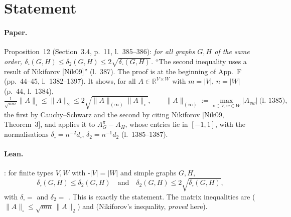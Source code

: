 

\paperversion

\section{Statement}

\paragraph{Paper.} Proposition~12 (Section~3.4, p.~11, l.~385--386): \emph{for all graphs $G,H$ of the same order,
$\delta_\square(G,H)\le\delta_2(G,H)\le2\sqrt{\delta_\square(G,H)}$.} ``The second inequality uses a result of
Nikiforov [Nik09]'' (l.~387). The proof is at the beginning of App.~F (pp.~44--45, l.~1382--1397). It shows, for all
$A\in\mathbb R^{V\times W}$ with $m=|V|$, $n=|W|$ (p.~44, l.~1384),
\[ \tfrac1{\sqrt{mn}}\|A\|_\square\le\|A\|_2\le2\sqrt{\|A\|_{(\infty)}\|A\|_\square},
   \qquad \|A\|_{(\infty)}:=\max_{v\in V,w\in W}|A_{vw}| \ \text{(l.~1385)}, \]
the first by Cauchy--Schwarz and the second by citing Nikiforov [Nik09, Theorem~3], and applies it to
$A^\pi_G-A_H$, whose entries lie in $[-1,1]$, with the normalisations $\delta_\square=n^{-2}d_\square$,
$\delta_2=n^{-1}d_2$ (l.~1385--1387).

\paragraph{Lean.} : for finite types $V,W$ with \hyp{$|V|=|W|$} and simple graphs
$G,H$,
\[ \delta_\square(G,H)\le\delta_2(G,H)\quad\text{and}\quad\delta_2(G,H)\le2\sqrt{\delta_\square(G,H)}, \]
with $\delta_\square=$  and $\delta_2=$ . This is exactly the statement.
The matrix inequalities are  ($\|A\|_\square\le\sqrt{mn}\,\|A\|_2$) and
 (Nikiforov's inequality, \emph{proved} here).

